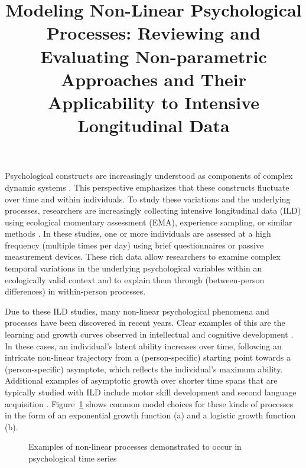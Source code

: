 \documentclass[man, floatsintext]{apa7}
\title{Modeling Non-Linear Psychological Processes: Reviewing and Evaluating
  Non-parametric Approaches and Their Applicability to Intensive
  Longitudinal Data}
\begin{document}
\maketitle

Psychological constructs are increasingly understood as components of complex
dynamic systems \parencite{nesselroade_studying_2004, wang_investigating_2012}.
This perspective emphasizes that these constructs fluctuate over time and
within individuals. To study these variations and the underlying processes,
researchers are increasingly collecting intensive longitudinal data (ILD) using
ecological momentary assessment (EMA), experience sampling, or similar methods
\parencite{fritz_so_2023}. In these studies, one or more individuals are
assessed at a high frequency (multiple times per day) using brief
questionnaires or passive measurement devices. These rich data allow
researchers to examine complex temporal variations in the underlying
psychological variables within an ecologically valid context and to explain
them through (between-person differences) in within-person processes.

Due to these ILD studies, many non-linear psychological phenomena and processes
have been discovered in recent years. Clear examples of this are the
learning and growth curves observed in intellectual and cognitive development
\parencite{kunnen_dynamic_2012, mcardle_comparative_2002}. In these cases, an
individual's latent ability increases over time, following an intricate
non-linear trajectory from a (person-specific) starting point towards a
(person-specific) asymptote, which reflects the individual's maximum ability.
Additional examples of asymptotic growth over shorter time spans that are
typically studied with ILD include motor skill development
\parencite{newell_time_2001} and second language acquisition
\parencite{de_bot_dynamic_2007}. Figure~\ref{fig:examplar_npn} shows
common model choices for these kinds of processes in the form of an
exponential growth function (a) and a logistic growth function (b).

\begin{figure}[!t]
  \caption{Examples of non-linear processes demonstrated to occur in
    psychological time series}
  \label{fig:examplar_npn}
\end{figure}
\end{document}
